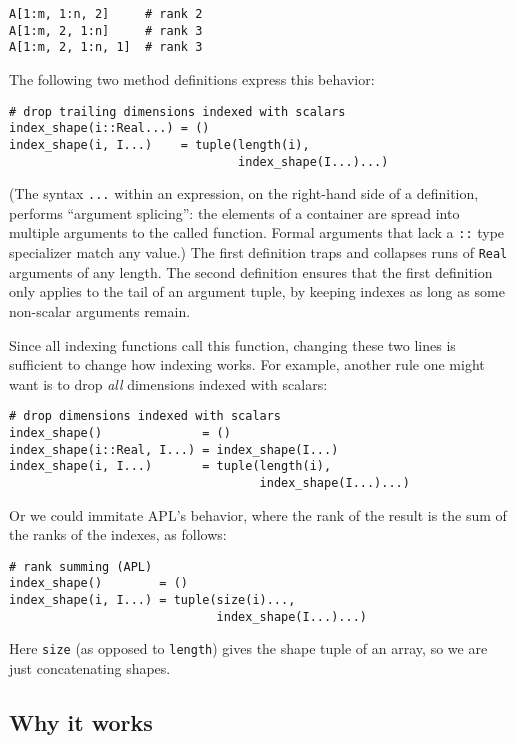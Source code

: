 \documentclass[preprint]{sigplanconf}
\newcommand{\code}[1]{\texttt{#1}}
\begin{document}
\begin{verbatim}
A[1:m, 1:n, 2]     # rank 2
A[1:m, 2, 1:n]     # rank 3
A[1:m, 2, 1:n, 1]  # rank 3
\end{verbatim}

The following two method definitions express this behavior:

{\small
\begin{verbatim}
# drop trailing dimensions indexed with scalars
index_shape(i::Real...) = ()
index_shape(i, I...)    = tuple(length(i),
                                index_shape(I...)...)
\end{verbatim}
}

(The syntax \code{...} within an expression, on the right-hand side of
a definition, performs ``argument splicing'': the elements of a container
are spread into multiple arguments to the called function. Formal
arguments that lack a \code{::} type specializer match any value.)
The first definition traps and collapses runs of \code{Real} arguments of
any length. The second definition ensures that the first definition only
applies to the tail of an argument tuple, by keeping indexes as long as
some non-scalar arguments remain.

Since all indexing functions call this function, changing these two lines is
sufficient to change how indexing works. For example, another rule one might
want is to drop \emph{all} dimensions indexed with scalars:

{\small
\begin{verbatim}
# drop dimensions indexed with scalars
index_shape()              = ()
index_shape(i::Real, I...) = index_shape(I...)
index_shape(i, I...)       = tuple(length(i),
                                   index_shape(I...)...)
\end{verbatim}
}

Or we could immitate APL's behavior, where the rank of the result is the sum
of the ranks of the indexes, as follows:

{\small
\begin{verbatim}
# rank summing (APL)
index_shape()        = ()
index_shape(i, I...) = tuple(size(i)...,
                             index_shape(I...)...)
\end{verbatim}
}

Here \code{size} (as opposed to \code{length}) gives the shape tuple of an array,
so we are just concatenating shapes.


\subsection{Why it works}
\end{document}
